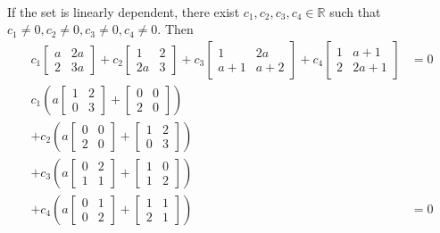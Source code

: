 \documentclass{article}
\begin{document}
\begin{solution}
\paragraph{}
If the set is linearly dependent, there exist $c_{1},c_{2},c_{3},c_{4} \in \mathbb{R}$ such that $c_{1}\ne 0,c_{2}\ne 0,c_{3}\ne 0,c_{4}\ne 0$. Then 
\begin{align*}
c_{1}
\begin{bmatrix}
a	&	2a	\\
2	&	3a
\end{bmatrix}
+c_{2}
\begin{bmatrix}
1	&	2	\\
2a	&	3
\end{bmatrix}
+c_{3}
\begin{bmatrix}
1	&	2a	\\
a+1	&	a+2
\end{bmatrix}
+c_{4}
\begin{bmatrix}
1	&	a+1	\\
2	&	2a+1
\end{bmatrix}
&= 0 \\
c_{1}
\left(
a
\begin{bmatrix}
1	&	2	\\
0	&	3
\end{bmatrix}
+
\begin{bmatrix}
0	&	0	\\
2	&	0
\end{bmatrix}
\right)&\\
+c_{2}
\left(
a
\begin{bmatrix}
0	&	0	\\
2	&	0
\end{bmatrix}
+
\begin{bmatrix}
1	&	2	\\
0	&	3
\end{bmatrix}
\right)&\\
+c_{3}
\left(
a
\begin{bmatrix}
0	&	2	\\
1	&	1
\end{bmatrix}
+
\begin{bmatrix}
1	&	0	\\
1	&	2
\end{bmatrix}
\right)&\\
+c_{4}
\left(
a
\begin{bmatrix}
0	&	1	\\
0	&	2
\end{bmatrix}
+
\begin{bmatrix}
1	&	1	\\
2	&	1
\end{bmatrix}
\right) &= 0
\end{align*}


\end{solution}
\end{document}
